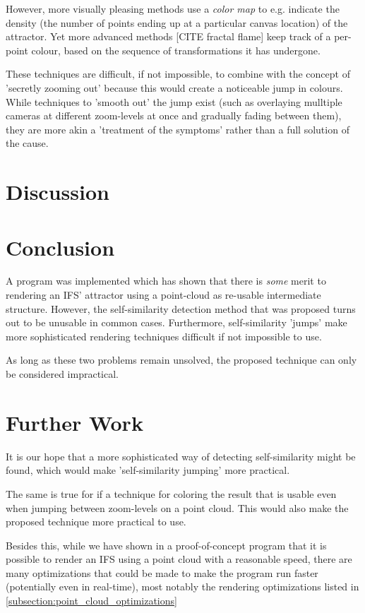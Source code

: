 \documentclass[11pt]{article}
\begin{document}
However, more visually pleasing methods use a \emph{color map} to e.g. indicate the density (the number of points ending up at a particular canvas location) of the attractor.
Yet more advanced methods [CITE fractal flame] keep track of a per-point colour, based on the sequence of transformations it has undergone.

These techniques are difficult, if not impossible, to combine with the concept of 'secretly zooming out' because this would create a noticeable jump in colours.
While techniques to 'smooth out' the jump exist (such as overlaying mulltiple cameras at different zoom-levels at once and gradually fading between them),
they are more akin a 'treatment of the symptoms' rather than a full solution of the cause.

\section{Discussion}
\label{sec:org186c58e}

\section{Conclusion}
\label{sec:orgf7f8276}

A program was implemented which has shown that there is \emph{some} merit to rendering an IFS' attractor using a point-cloud as re-usable intermediate structure.
However, the self-similarity detection method that was proposed turns out to be unusable in common cases.
Furthermore, self-similarity 'jumps' make more sophisticated rendering techniques difficult if not impossible to use.

As long as these two problems remain unsolved, the proposed technique can only be considered impractical.

\section{Further Work}
\label{sec:org155d165}

It is our hope that a more sophisticated way of detecting self-similarity might be found,
which would make 'self-similarity jumping' more practical.

The same is true for if a technique for coloring the result that is usable even when jumping between zoom-levels on a point cloud.
This would also make the proposed technique more practical to use.

Besides this, while we have shown in a proof-of-concept program that it is possible to render an IFS using a point cloud
with a reasonable speed, there are many optimizations that could be made to make the program run faster (potentially even in real-time),
most notably the rendering optimizations listed in \autoref{subsection:point_cloud_optimizations}
\end{document}
